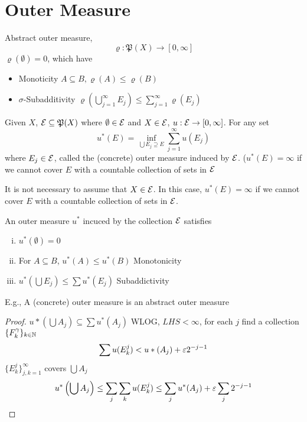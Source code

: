 \section{Outer Measure}

\begin{definition}
  Abstract outer measure, 
  \[\varrho: \mathfrak{P}(X) \to [0, \infty]\]
  $\varrho(\emptyset) = 0$, which have
  \begin{itemize}
    \item Monoticity $A \subseteq B, \varrho(A) \le \varrho(B)$
    \item $\sigma$-Subadditivity $\varrho\left(\bigcup_{j=1}^\infty E_j\right) \le \sum_{j=1}^\infty \varrho(E_j)$
  \end{itemize}
\end{definition}


\begin{definition}
  Given $X$, $\mathcal E \subseteq \mathfrak{P}(X)$ where $\emptyset \in \mathcal E$ and $X \in \mathcal E$, $u: \mathcal E \to [0, \infty]$.
  For any set 
  \[u^*(E) = \inf_{\bigcup E_j \supseteq E}\sum_{j=1}^\infty u(E_j)\]
  where $E_j \in \mathcal E$, called the (concrete) outer measure induced by $\mathcal E$.
  ($u^*(E) = \infty$ if we cannot cover $E$ with a countable collection of sets in $\mathcal E$
\end{definition}

\begin{remark}
  It is not necessary to assume that $X \in \mathcal E$.
  In this case, $u^*(E) = \infty$ if we cannot cover $E$ with a countable collection of sets in $\mathcal E$.
\end{remark}

\begin{lemma}
  An outer measure $u^*$ incuced by the collection $\mathcal E$ satisfies
  \begin{enumerate}[(i)]
    \item $u^*(\emptyset) = 0$
    \item For $A \subseteq B$, $u^*(A) \le u^*(B)$ Monotonicity
    \item $u^*(\bigcup E_j) \le \sum u^*(E_j)$ Subaddictivity
  \end{enumerate}
  E.g., A (concrete) outer measure is an abstract outer measure
\end{lemma}

\begin{proof}
  $u*(\bigcup A_j) \subseteq \sum u^*(A_j)$
  WLOG, $LHS < \infty$, for each $j$ find a collection $\{F_k^\gamma\}_{k \in \mathbb N}$
  \[\sum u(E_k^j) < u*(A_j) + \varepsilon 2^{-j-1}\]
  $\{E_k^j\}_{j, k=1}^\infty$ covers $\bigcup A_j$
  \[u^*\left(\bigcup A_j\right)\le \sum_j\sum_k u(E_k^j) \le \sum_j u^*(A_j) + \varepsilon \sum_j {2^{-j-1}}\]
\end{proof}

